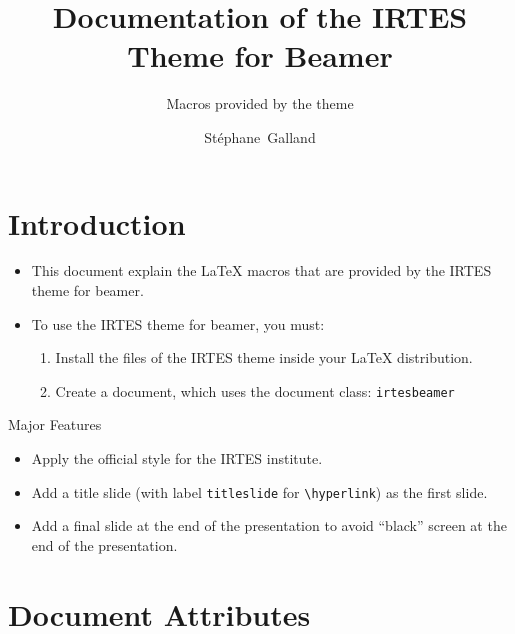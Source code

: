 \documentclass[english,circlenumberstyle]{irtesbeamer}
\title{Documentation of the IRTES Theme for Beamer}
\subtitle{Macros provided by the theme}
\author[S.~Galland]{St\'ephane~Galland}
\begin{document}
\tableofcontentslide

\section{Introduction}
\begin{frame}{\secname}
	\begin{itemize}
	\item This document explain the {\LaTeX} macros that are provided by the IRTES theme for beamer.
	\item To use the IRTES theme for beamer, you must:
		\begin{enumerate}
		\item Install the files of the IRTES theme inside your {\LaTeX} distribution.
		\item Create a document, which uses the document class: \texttt{irtesbeamer}
		\end{enumerate}
	\end{itemize}
\end{frame}

\begin{frame}{Major Features}
	\begin{itemize}
	\item Apply the official style for the IRTES institute.
	\item Add a title slide (with label \texttt{titleslide} for \texttt{{\textbackslash}hyperlink}) as the first slide.
	\item Add a final slide at the end of the presentation to avoid ``black'' screen at the end of the presentation.
	\end{itemize}
\end{frame}

\section{Document Attributes}
\end{document}
